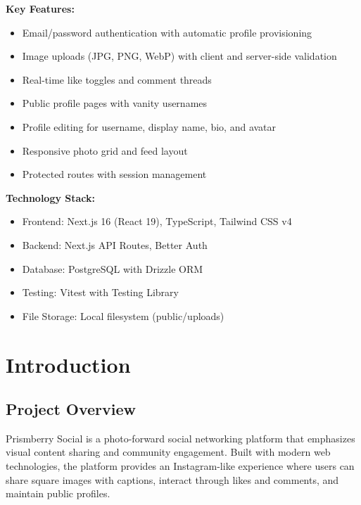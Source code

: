 \documentclass[12pt,a4paper]{report}
\begin{document}
\textbf{Key Features:}
\begin{itemize}
    \item Email/password authentication with automatic profile provisioning
    \item Image uploads (JPG, PNG, WebP) with client and server-side validation
    \item Real-time like toggles and comment threads
    \item Public profile pages with vanity usernames
    \item Profile editing for username, display name, bio, and avatar
    \item Responsive photo grid and feed layout
    \item Protected routes with session management
\end{itemize}

\textbf{Technology Stack:}
\begin{itemize}
    \item Frontend: Next.js 16 (React 19), TypeScript, Tailwind CSS v4
    \item Backend: Next.js API Routes, Better Auth
    \item Database: PostgreSQL with Drizzle ORM
    \item Testing: Vitest with Testing Library
    \item File Storage: Local filesystem (public/uploads)
\end{itemize}

\newpage

\tableofcontents

\newpage

\listoftables

\newpage

\listoffigures

\newpage

\chapter{Introduction}

\section{Project Overview}

Prismberry Social is a photo-forward social networking platform that emphasizes visual content sharing and community engagement. Built with modern web technologies, the platform provides an Instagram-like experience where users can share square images with captions, interact through likes and comments, and maintain public profiles.
\end{document}
